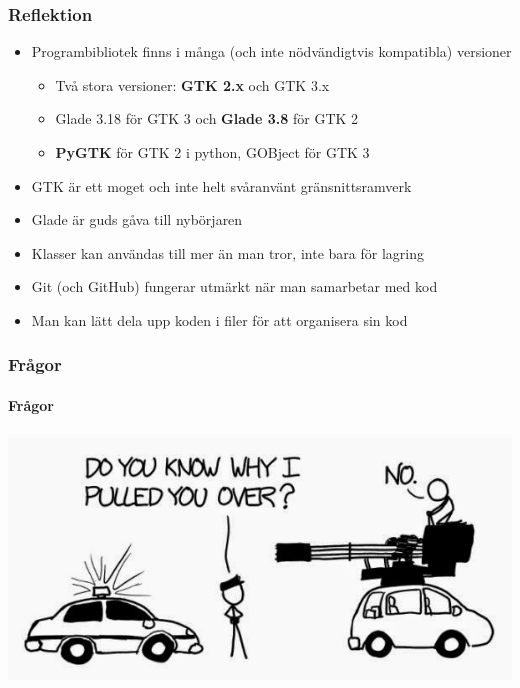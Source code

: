 \documentclass{beamer}
\begin{document}
\begin{frame}
    \frametitle{Reflektion}
    
    \begin{itemize}
        \item Programbibliotek finns i många (och inte nödvändigtvis kompatibla) versioner
        \begin{itemize}
            \item Två stora versioner: \textbf{GTK 2.x} och GTK 3.x
            \item Glade 3.18 för GTK 3 och \textbf{Glade 3.8} för GTK 2
            \item \textbf{PyGTK} för GTK 2 i python, GOBject för GTK 3
        \end{itemize}
        \pause
        \item GTK är ett moget och inte helt svåranvänt gränsnittsramverk
        \pause
        \item Glade är guds gåva till nybörjaren
        \pause
        \item Klasser kan användas till mer än man tror, inte bara för lagring
        \pause
        \item Git (och GitHub) fungerar utmärkt när man samarbetar med kod
        \pause
        \item Man kan lätt dela upp koden i filer för att organisera sin kod
    \end{itemize}
\end{frame}

\begin{frame}
    \frametitle{Frågor}
    \framesubtitle{Frågor}
    \includegraphics[width=\textwidth]{xkcd.jpg}
\end{frame}
\end{document}
